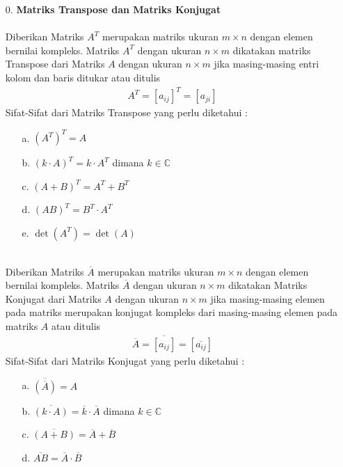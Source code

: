 \documentclass[11pt,a4paper]{article}
\theoremstyle{plain}
\theoremstyle{definition}
\theoremstyle{remark}
\begin{document}
\begin{enumerate}
	\item[0.] \textbf{Matriks Transpose dan Matriks Konjugat}\\
	\\
	\hspace*{0.5cm} Diberikan Matriks $A^T$ merupakan matriks ukuran $m\times n$ dengan elemen bernilai kompleks. Matriks $A^T$ dengan ukuran $n\times m$ dikatakan matriks Transpose dari Matriks $A$ dengan ukuran $n\times m$ jika masing-masing entri kolom dan baris ditukar atau ditulis
	\begin{align*}
	A^T=\left[ a_{ij}\right]^T=\left[ a_{ji}\right]
	\end{align*}
	Sifat-Sifat dari Matriks Transpose yang perlu diketahui :
	\begin{enumerate}
		\item[a.] $(A^T)^T=A$
		\item[b.] $(k\cdot A)^T=k\cdot A^T$ dimana $k\in\mathbb{C}$
		\item[c.] $(A+B)^T=A^T+B^T$
		\item[d.]  $(AB)^T=B^T\cdot A^T$
		\item[e.] $\det(A^T)=\det(A)$
	\end{enumerate}
	\- \\
	\hspace*{0.5cm} Diberikan Matriks $\overline{A}$ merupakan matriks ukuran $m\times n$ dengan elemen bernilai kompleks. Matriks $\overline{A}$ dengan ukuran $n\times m$ dikatakan Matriks Konjugat dari Matriks $A$ dengan ukuran $n\times m$ jika masing-masing elemen pada matriks merupakan konjugat kompleks dari masing-masing elemen pada matriks $A$ atau ditulis
	\begin{align*}
	\overline{A}=\overline{\left[ a_{ij}\right]}=\left[ \overline{a_{ij}}\right]
	\end{align*}
	Sifat-Sifat dari Matriks Konjugat yang perlu diketahui :
	\begin{enumerate}
		\item[a.] $\overline{(\overline{A})} = A$
		\item[b.] $\overline{(k\cdot A)}=\overline{k} \cdot \overline{A}$ dimana $k\in\mathbb{C}$
		\item[c.] $\overline{(A+B)}=\overline{A}+\overline{B}$
		\item[d.]  $\overline{AB}=\overline{A}\cdot \overline{B}$
	\end{enumerate}
	

\end{enumerate}
\end{document}
